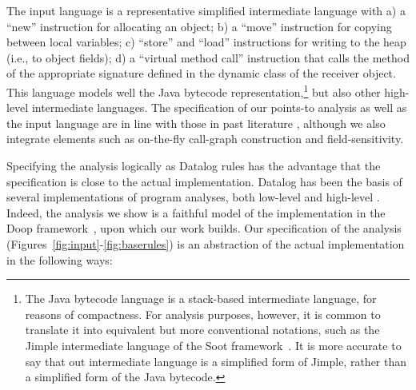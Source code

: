 The input language is a representative simplified intermediate
language with a) a ``new'' instruction for allocating an object; b) a
``move'' instruction for copying between local variables; c) ``store''
and ``load'' instructions for writing to the heap (i.e., to object
fields); d) a ``virtual method call'' instruction that calls the
method of the appropriate signature defined in the dynamic
class of the receiver object. This language models well the Java
bytecode representation,\footnote{The Java bytecode language is a
  stack-based intermediate language, for reasons of compactness.  For
  analysis purposes, however, it is common to translate it into
  equivalent but more conventional notations, such as the Jimple
  intermediate language of the Soot
  framework~\cite{vall99soot,valleerai00optimizing}. It is more
  accurate to say that out intermediate language is a simplified form
  of Jimple, rather than a simplified form of the Java bytecode.} but
also other high-level intermediate languages. 
The specification of our points-to analysis as well as the input
language are in line with those in past literature
\cite{Guarnieri:2009:GMS:1855768.1855778,livshits12}, although we also
integrate elements such as on-the-fly call-graph construction and
field-sensitivity.

Specifying the analysis logically as Datalog rules has the advantage
that the specification is close to the actual implementation.  Datalog
has been the basis of several implementations of program analyses,
both low-level
\cite{repsdb,DBLP:conf/aplas/WhaleyACL05,1065169,996859,BS-OOPSLA09}
and high-level \cite{1368142,codequest}. Indeed, the analysis we show
is a faithful model of the implementation in the Doop
framework~\cite{BS-OOPSLA09}, upon which our work builds. Our
specification of the analysis
(Figures~\ref{fig:input}-\ref{fig:baserules}) is an abstraction of the
actual implementation in the following ways:

